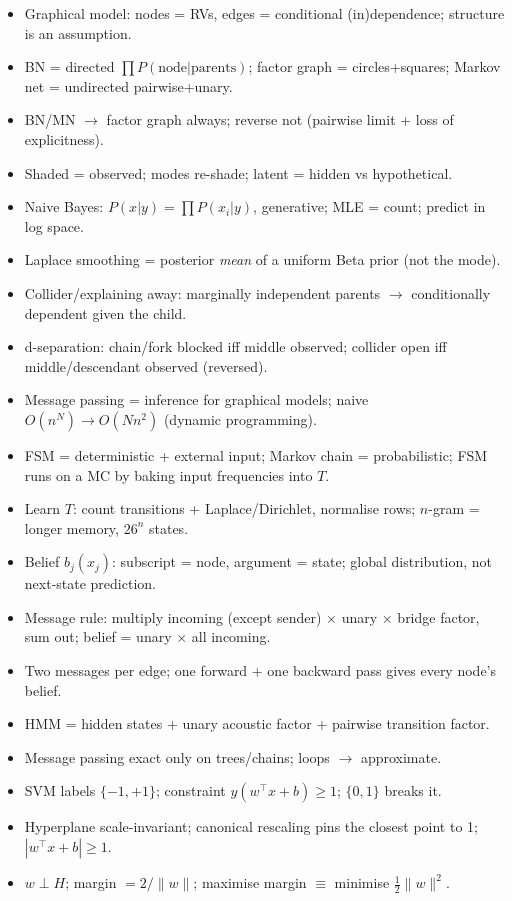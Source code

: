 \documentclass[11pt, a4paper]{article}
\begin{document}
\begin{tldrbox}
\begin{itemize}[leftmargin=*]
  \item Graphical model: nodes = RVs, edges = conditional (in)dependence; structure is an assumption.
  \item BN = directed $\prod P(\text{node}|\text{parents})$; factor graph = circles+squares; Markov net = undirected pairwise+unary.
  \item BN/MN $\to$ factor graph always; reverse not (pairwise limit + loss of explicitness).
  \item Shaded = observed; modes re-shade; latent = hidden vs hypothetical.
  \item Naive Bayes: $P(x|y)=\prod P(x_i|y)$, generative; MLE = count; predict in log space.
  \item Laplace smoothing = posterior \emph{mean} of a uniform Beta prior (not the mode).
  \item Collider/explaining away: marginally independent parents $\to$ conditionally dependent given the child.
  \item d-separation: chain/fork blocked iff middle observed; collider open iff middle/descendant observed (reversed).
  \item Message passing = inference for graphical models; naive $O(n^N)\to O(Nn^2)$ (dynamic programming).
  \item FSM = deterministic + external input; Markov chain = probabilistic; FSM runs on a MC by baking input frequencies into $T$.
  \item Learn $T$: count transitions + Laplace/Dirichlet, normalise rows; $n$-gram = longer memory, $26^n$ states.
  \item Belief $b_j(x_j)$: subscript = node, argument = state; global distribution, not next-state prediction.
  \item Message rule: multiply incoming (except sender) $\times$ unary $\times$ bridge factor, sum out; belief = unary $\times$ all incoming.
  \item Two messages per edge; one forward + one backward pass gives every node's belief.
  \item HMM = hidden states + unary acoustic factor + pairwise transition factor.
  \item Message passing exact only on trees/chains; loops $\to$ approximate.
  \item SVM labels $\{-1,+1\}$; constraint $y(w^\top x+b)\ge1$; $\{0,1\}$ breaks it.
  \item Hyperplane scale-invariant; canonical rescaling pins the closest point to 1; $|w^\top x+b|\ge1$.
  \item $w\perp H$; margin $=2/\|w\|$; maximise margin $\equiv$ minimise $\tfrac12\|w\|^2$.

\end{itemize}
\end{tldrbox}
\end{document}

